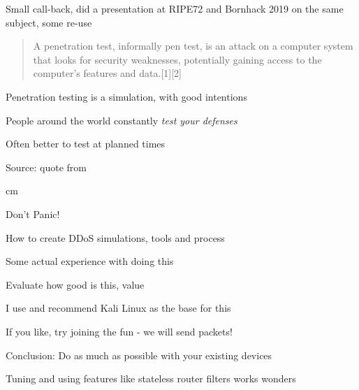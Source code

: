 \documentclass[Screen16to9,17pt]{foils}
\begin{document}


Small call-back, did a presentation at RIPE72 and Bornhack 2019 on the same subject, some re-use\\

\hlkprofiluk


\begin{quote}
A penetration test, informally pen test, is an attack on a computer system that looks for security weaknesses, potentially gaining access to the computer's features and data.[1][2]
\end{quote}

\begin{list1}
\item Penetration testing is a simulation, with good intentions
\item People around the world constantly \emph{test your defenses}
\item Often better to test at planned times
\end{list1}

Source: quote from 



 cm

\centerline{\color{titlecolor}\LARGE Don't Panic!}

\begin{list1}
\item How to create DDoS simulations, tools and process
\item Some actual experience with doing this
\item Evaluate how good is this, value
\item I use and recommend Kali Linux as the base for this
\item If you like, try joining the fun - we will send packets!
\end{list1}



\begin{list1}
\item Conclusion: Do as much as possible with your existing devices
\item Tuning and using features like stateless router filters works wonders
\end{list1}
\end{document}
